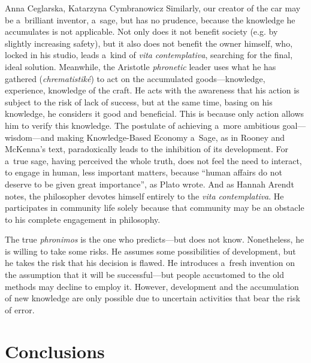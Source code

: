 \begin{artengenv2auth}{Anna Ceglarska, Katarzyna Cymbranowicz}
Similarly, our creator of the car may be a~brilliant inventor, a~sage, but has no prudence, because the knowledge he accumulates is not applicable. Not only does it not benefit society (e.g. by slightly increasing safety), but it also does not benefit the owner himself, who, locked in his studio, leads a~kind of \textit{vita} \textit{contemplativa}, searching for the final, ideal solution. Meanwhile, the Aristotle \textit{phronetic} leader uses what he has gathered (\textit{chrematistiké}) to act on the accumulated goods---knowledge, experience, knowledge of the craft. He acts with the awareness that his action is subject to the risk of lack of success, but at the same time, basing on his knowledge, he considers it good and beneficial. This is because only action allows him to verify this knowledge. The postulate of achieving a~more ambitious goal---wisdom---and making Knowledge-Based Economy a~Sage, as in Rooney and McKenna's text, paradoxically leads to the inhibition of its development. For a~true sage, having perceived the whole truth, does not feel the need to interact, to engage in human, less important matters, because ``human affairs do not deserve to be given great importance'', as Plato 
\parencite[][ {803b}]{plato_plato_1967-1} %
 wrote. And as Hannah Arendt 
\parencite*[][p.32]{arendt_promise_2005} %
 notes, the philosopher devotes himself entirely to the \textit{vita contemplativa}. He participates in community life solely because that community may be an obstacle to his complete engagement in philosophy.



The true \textit{phronimos} is the one who predicts---but does not know. Nonetheless, he is willing to take some risks. He assumes some possibilities of development, but he takes the risk that his decision is flawed. He introduces a~fresh invention on the assumption that it will be successful---but people accustomed to the old methods may decline to employ it. However, development and the accumulation of new knowledge are only possible due to uncertain activities that bear the risk of error.



\section{Conclusions}


\end{artengenv2auth}
